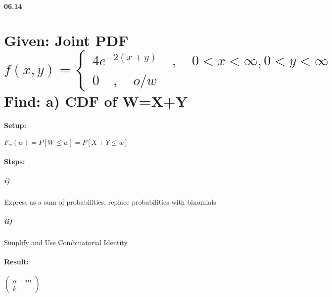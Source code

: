 {\bf 06.14}


\section*{Given: Joint PDF $f(x,y)=\begin{cases} 4{ e }^{ -2(x+y) }\quad ,\quad 0<x<\infty ,0<y<\infty  \\ 0\quad ,\quad o/w \end{cases}$\\ Find: a) CDF of W=X+Y}

\paragraph{Setup:}  ${F}_{w}(w)=P[W\le w]=P[X+Y\le w]$

\paragraph{Steps:} 

\subparagraph{i)} Express as a sum of probabilities, replace probabilities with binomials

\subparagraph{ii)} Simplify and Use Combinatorial Identity

\paragraph{Result:} $\left( \begin{matrix} n+m \\ k \end{matrix} \right) $
\\

